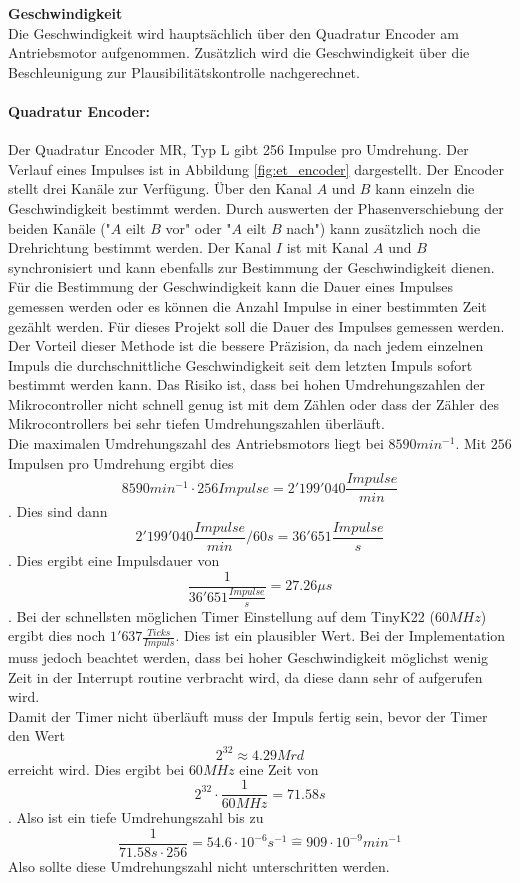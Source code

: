 \documentclass[../../main.tex]{subfiles}
\begin{document}
    \textbf{Geschwindigkeit}\\ \label{et_geschwindigkeit}
    Die Geschwindigkeit wird hauptsächlich über den Quadratur Encoder am Antriebsmotor aufgenommen. Zusätzlich wird die Geschwindigkeit über die Beschleunigung zur Plausibilitätskontrolle nachgerechnet.

    \paragraph{Quadratur Encoder:} Der Quadratur Encoder MR, Typ L gibt 256 Impulse pro Umdrehung. Der Verlauf eines Impulses ist in Abbildung \ref{fig:et_encoder} dargestellt. Der Encoder stellt drei Kanäle zur Verfügung. Über den Kanal $A$ und $B$ kann einzeln die Geschwindigkeit bestimmt werden. Durch auswerten der Phasenverschiebung der beiden Kanäle ("$A$ eilt $B$ vor" oder "$A$ eilt $B$ nach") kann zusätzlich noch die Drehrichtung bestimmt werden. Der Kanal $I$ ist mit Kanal $A$ und $B$ synchronisiert und kann ebenfalls zur Bestimmung der Geschwindigkeit dienen.\\
    Für die Bestimmung der Geschwindigkeit kann die Dauer eines Impulses gemessen werden oder es können die Anzahl Impulse in einer bestimmten Zeit gezählt werden. Für dieses Projekt soll die Dauer des Impulses gemessen werden. Der Vorteil dieser Methode ist die bessere Präzision, da nach jedem einzelnen Impuls die durchschnittliche Geschwindigkeit seit dem letzten Impuls sofort bestimmt werden kann. Das Risiko ist, dass bei hohen Umdrehungszahlen der Mikrocontroller nicht schnell genug ist mit dem Zählen oder dass der Zähler des Mikrocontrollers bei sehr tiefen Umdrehungszahlen überläuft.\\
    Die maximalen Umdrehungszahl des Antriebsmotors liegt bei $8590 min^{-1}$. Mit $256$ Impulsen pro Umdrehung ergibt dies $$8590 min^{-1} \cdot 256 Impulse = 2'199'040 \frac{Impulse}{min}$$.
    Dies sind dann $$ 2'199'040 \frac{Impulse}{min} / 60s = 36'651 \frac{Impulse}{s} $$.
    Dies ergibt eine Impulsdauer von $$\frac{1}{36'651 \frac{Impulse}{s}} = 27.26\mu s$$. Bei der schnellsten möglichen Timer Einstellung auf dem TinyK22 ($60MHz$) ergibt dies noch $1'637 \frac{Ticks}{Impuls}$. Dies ist ein plausibler Wert. Bei der Implementation muss jedoch beachtet werden, dass bei hoher Geschwindigkeit möglichst wenig Zeit in der Interrupt routine verbracht wird, da diese dann sehr of aufgerufen wird.\\
    Damit der Timer nicht überläuft muss der Impuls fertig sein, bevor der Timer den Wert $$2^{32} \approx 4.29 Mrd$$ erreicht wird. Dies ergibt bei $60MHz$ eine Zeit von $$2^{32} \cdot \frac{1}{60MHz} = 71.58s$$. Also ist ein tiefe Umdrehungszahl bis zu $$\frac{1}{71.58s \cdot 256} = 54.6 \cdot 10^{-6} s^{-1} \hat{=} 909 \cdot 10^{-9} min^{-1}$$
    Also sollte diese Umdrehungszahl nicht unterschritten werden. 
    
\end{document}
